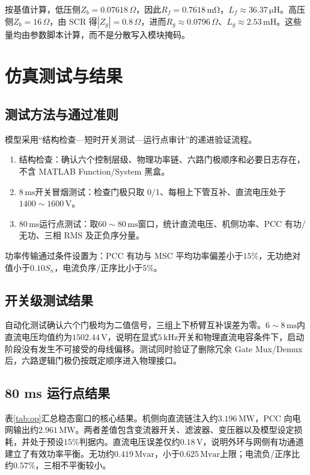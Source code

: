 \documentclass[UTF8,zihao=-4,fontset=fandol]{ctexrep}
\begin{document}
按基值计算，低压侧\(Z_b=0.07618\,\Omega\)，因此\(R_f=0.7618\,\mathrm{m\Omega}\)，\(L_f\approx36.37\,\mathrm{\mu H}\)。高压侧\(Z_b=16\,\Omega\)，由 SCR 得\(|Z_g|=0.8\,\Omega\)，进而\(R_g\approx0.0796\,\Omega\)、\(L_g\approx2.53\,\mathrm{mH}\)。这些量均由参数脚本计算，而不是分散写入模块掩码。

\chapter{仿真测试与结果}
\section{测试方法与通过准则}
模型采用“结构检查---短时开关测试---运行点审计”的递进验证流程。
\begin{enumerate}
  \item 结构检查：确认六个控制层级、物理功率链、六路门极顺序和必要日志存在，不含 MATLAB Function/System 黑盒。
  \item \(8\,\mathrm{ms}\)开关冒烟测试：检查门极只取 0/1、每相上下管互补、直流电压处于\(1400\sim1600\,\mathrm{V}\)。
  \item \(80\,\mathrm{ms}\)运行点测试：取\(60\sim80\,\mathrm{ms}\)窗口，统计直流电压、机侧功率、PCC 有功/无功、三相 RMS 及正负序分量。
\end{enumerate}
功率传输通过条件设置为：PCC 有功与 MSC 平均功率偏差小于\(15\%\)，无功绝对值小于\(0.10S_n\)，电流负序/正序比小于\(5\%\)。

\section{开关级测试结果}
自动化测试确认六个门极均为二值信号，三组上下桥臂互补误差为零。\(6\sim8\,\mathrm{ms}\)内直流电压均值约为\(1502.44\,\mathrm{V}\)，说明在显式\(5\,\mathrm{kHz}\)开关和物理直流电容条件下，启动阶段没有发生不可接受的母线偏移。测试同时验证了删除冗余 Gate Mux/Demux 后，六路逻辑门极仍按既定顺序进入物理接口。

\section{80 ms 运行点结果}
表\ref{tab:op}汇总稳态窗口的核心结果。机侧向直流链注入约\(3.196\,\mathrm{MW}\)，PCC 向电网输出约\(2.961\,\mathrm{MW}\)。两者差值包含变流器开关、滤波器、变压器以及模型设定损耗，并处于预设\(15\%\)判据内。直流电压误差仅约\(0.18\,\mathrm{V}\)，说明外环与网侧有功通道建立了有效功率平衡。无功约\(0.419\,\mathrm{Mvar}\)，小于\(0.625\,\mathrm{Mvar}\)上限；电流负/正序比约\(0.57\%\)，三相不平衡较小。
\end{document}
